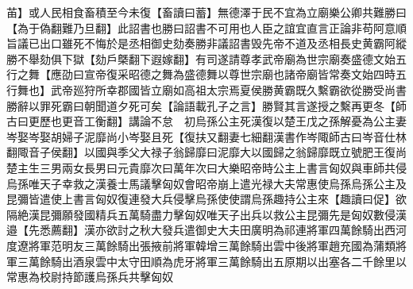 苖】或人民相食畜積至今未復【畜讀曰蓄】無德澤于民不宜為立廟樂公卿共難勝曰【為于偽翻難乃旦翻】此詔書也勝曰詔書不可用也人臣之誼宜直言正論非苟阿意順旨議已出口雖死不悔於是丞相御史劾奏勝非議詔書毁先帝不道及丞相長史黄霸阿縱勝不舉劾俱下獄【劾戶槩翻下遐嫁翻】有司遂請尊孝武帝廟為世宗廟奏盛德文始五行之舞【應劭曰宣帝復采昭德之舞為盛德舞以尊世宗廟也諸帝廟皆常奏文始四時五行舞也】武帝廵狩所幸郡國皆立廟如高祖太宗焉夏侯勝黄霸既久繫霸欲從勝受尚書勝辭以罪死霸曰朝聞道夕死可矣【論語載孔子之言】勝賢其言遂授之繫再更冬【師古曰更歷也更音工衡翻】講論不怠　初烏孫公主死漢復以楚王戊之孫解憂為公主妻岑娶岑娶胡婦子泥靡尚小岑娶且死【復扶又翻妻七細翻漢書作岑陬師古曰岑音仕林翻陬音子侯翻】以國與季父大禄子翁歸靡曰泥靡大以國歸之翁歸靡既立號肥王復尚楚主生三男兩女長男曰元貴靡次曰萬年次曰大樂昭帝時公主上書言匈奴與車師共侵烏孫唯天子幸救之漢養士馬議擊匈奴會昭帝崩上遣光禄大夫常惠使烏孫烏孫公主及昆彌皆遣使上書言匈奴復連發大兵侵擊烏孫使使謂烏孫趣持公主來【趣讀曰促】欲隔絶漢昆彌願發國精兵五萬騎盡力擊匈奴唯天子出兵以救公主昆彌先是匈奴數侵漢邉【先悉薦翻】漢亦欲討之秋大發兵遣御史大夫田廣明為祁連將軍四萬餘騎出西河度遼將軍范明友三萬餘騎出張掖前將軍韓增三萬餘騎出雲中後將軍趙充國為蒲類將軍三萬餘騎出酒泉雲中太守田順為虎牙將軍三萬餘騎出五原期以出塞各二千餘里以常惠為校尉持節護烏孫兵共擊匈奴

